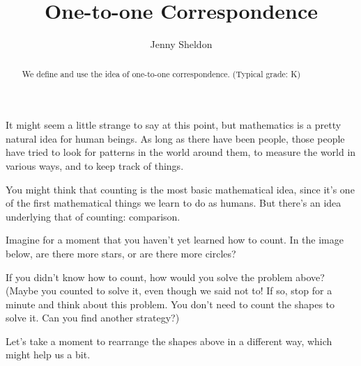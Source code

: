 \documentclass{ximera}
\title{One-to-one Correspondence}
\author{Jenny Sheldon}
\begin{document}
\begin{abstract}
We define and use the idea of one-to-one correspondence. (Typical grade: K)
\end{abstract}
\maketitle


It might seem a little strange to say at this point, but mathematics is a pretty natural idea for 
human beings. As long as there have been people, those people have tried to look for patterns in the world 
around them, to measure the world in various ways, and to keep track of things.

You might think that counting is the most basic mathematical idea, since it's one of the first mathematical 
things we learn to do as humans. But there's an idea underlying that of counting: comparison.

\begin{question}
Imagine for a moment that you haven't yet learned how to count. In the image below, are there more stars, or 
are there more circles?

\begin{center}
\end{center}

\begin{multipleChoice}
\end{multipleChoice}
\end{question}


If you didn't know how to count, how would you solve the problem above? (Maybe you counted to solve it, 
even 
though we said not to! If so, stop for a minute and think about this problem. You don't need to count the 
shapes 
to solve it. Can you find another strategy?)

Let's take a moment to rearrange the shapes above in a different way, which might help us a bit.
\end{document}
